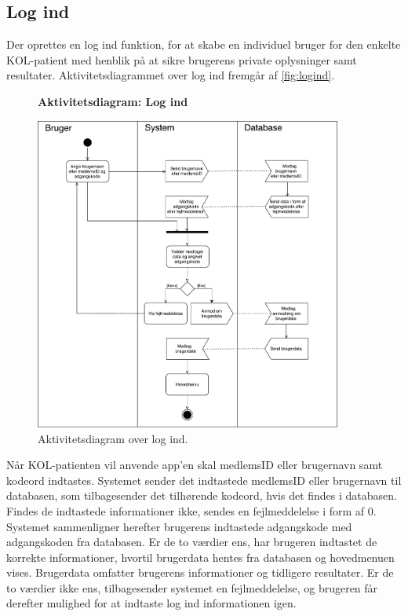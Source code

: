 \subsection*{Log ind}
Der oprettes en log ind funktion, for at skabe en individuel bruger for den enkelte KOL-patient med henblik på at sikre brugerens private oplysninger samt resultater. Aktivitetsdiagrammet over log ind fremgår af \autoref{fig:logind}. 

\begin{figure} [H]
\centering
\textbf{Aktivitetsdiagram: Log ind}\par\medskip
\includegraphics[width=0.9\textwidth]{figures/aktivitetsdiagram/Logind}
\caption{Aktivitetsdiagram over log ind.}
\label{fig:logind}
\end{figure}


\noindent
Når KOL-patienten vil anvende app'en skal medlemsID eller brugernavn samt kodeord indtastes. Systemet sender det indtastede medlemsID eller brugernavn til databasen, som tilbagesender det tilhørende kodeord, hvis det findes i databasen. Findes de indtastede informationer ikke, sendes en fejlmeddelelse i form af 0. Systemet sammenligner herefter brugerens indtastede adgangskode med adgangskoden fra databasen. Er de to værdier ens, har brugeren indtastet de korrekte informationer, hvortil brugerdata hentes fra databasen og hovedmenuen vises. Brugerdata omfatter brugerens informationer og tidligere resultater. Er de to værdier ikke ens, tilbagesender systemet en fejlmeddelelse, og brugeren får derefter mulighed for at indtaste log ind informationen igen. 